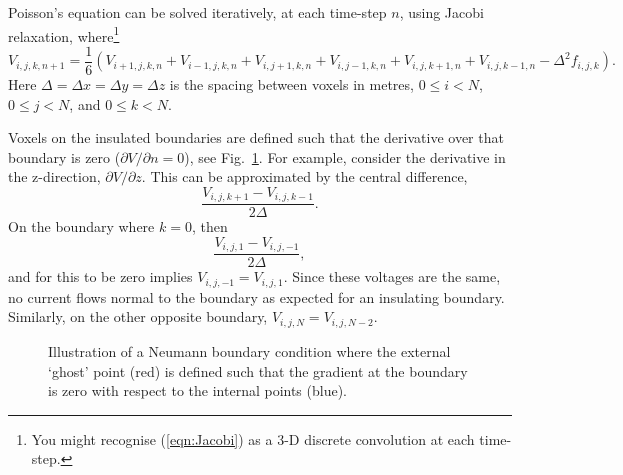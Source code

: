 \documentclass[a4paper,11pt]{article}
\begin{document}
Poisson's equation can be solved iteratively, at each time-step $n$,
using Jacobi relaxation, where\footnote{You might recognise
  (\ref{eqn:Jacobi}) as a 3-D discrete convolution at each time-step.}
%
\begin{equation}
  V_{i,j,k,n+1} = \frac{1}{6} \left(V_{i+1,j,k,n} + V_{i-1,j,k,n} + V_{i,j+1,k,n} + V_{i,j-1,k,n} + V_{i,j,k+1,n} + V_{i,j,k-1,n} - \Delta^2 f_{i,j,k}\right).
\label{eqn:Jacobi}
\end{equation}
%
Here $\Delta = \Delta x = \Delta y = \Delta z$ is the spacing between
voxels in metres, $0 \le i < N$, $0 \le j < N$, and $0 \le k < N$.

Voxels on the insulated boundaries are defined such that the
derivative over that boundary is zero ($\partial V / \partial n = 0$),
see Fig.~\ref{fig:Boundary}.  For example, consider the derivative in
the z-direction, $\partial V / \partial z$.  This can be approximated
by the central difference,
%
\begin{equation}
  \frac{V_{i,j,k+1} - V_{i,j,k-1}}{2\Delta}.
\end{equation}
%
On the boundary where $k=0$, then
%
\begin{equation}
  \frac{V_{i,j,1} - V_{i,j,-1}}{2\Delta},
\end{equation}
%
and for this to be zero implies $V_{i,j,-1} = V_{i,j,1}$.  Since these
voltages are the same, no current flows normal to the boundary as
expected for an insulating boundary.  Similarly, on the other opposite
boundary, $V_{i,j,N} = V_{i,j,N-2}$.


\begin{figure}
  \centering
  \caption{Illustration of a Neumann boundary condition where the external
  `ghost' point (red) is defined such that the gradient at the boundary is zero
  with respect to the internal points (blue).}
  \label{fig:Boundary}
\end{figure}
\end{document}
